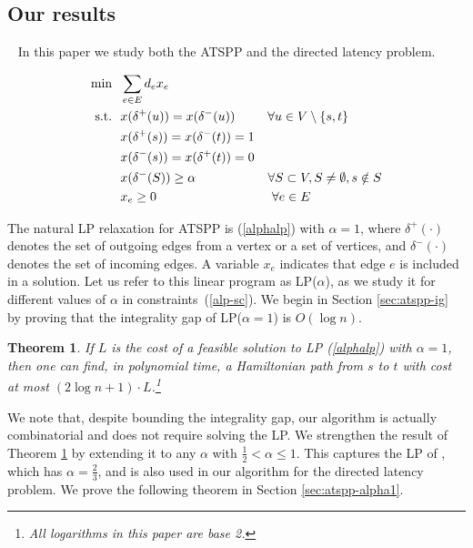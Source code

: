 \documentclass[11pt]{article}
\newtheorem{theorem}{Theorem}[section]
\begin{document}
\subsection{Our results}~
In this paper we study both the ATSPP and the directed latency problem.
\begin{figure}[ht]
\begin{align} 
\mbox{min}~~ & \sum_{e\in E} d_e x_e  \label{alphalp} \\
\mbox{s.t.}~~ & x(\delta^+(u))=x(\delta^-(u)) \hspace{9mm} \forall u\in V \setminus \{s,t\} \label{flcon} \\
& x(\delta^+(s))=x(\delta^-(t))=1  \label{con2}  \\
& x(\delta^-(s))=x(\delta^+(t))=0  \label{con3} \\
& x(\delta^-(S))\geq \alpha \hspace{20mm} \forall S\subset V, S \neq \emptyset, s\notin S \label{alp-sc} \\
& x_e \geq 0  \hspace{32mm}  \forall e\in E  \notag 
\end{align}
\end{figure}
The natural LP relaxation for ATSPP is (\ref{alphalp}) with $\alpha=1$, where $\delta^+(\cdot)$ denotes the set of outgoing edges from a vertex or a set of vertices, and $\delta^-(\cdot)$ denotes the set of incoming edges. A variable $x_e$ indicates that edge $e$ is included in a solution.
Let us refer to this linear program as LP($\alpha$), 
as we study it for different values of $\alpha$ in constraints~(\ref{alp-sc}). 
We begin in Section \ref{sec:atspp-ig} by proving that the integrality gap of LP($\alpha=1$) is $O(\log n)$.


\begin{theorem}\label{thm:ig}
If $L$ is the cost of a feasible solution to LP (\ref{alphalp})
with $\alpha =1$, then one can find, in polynomial time,
a Hamiltonian path from $s$ to $t$ with cost at most
$(2 \log n +1) \cdot L$.\footnote{All logarithms in this paper are base 2.}
\end{theorem}

We note that, despite bounding the integrality gap, our algorithm is actually combinatorial and does not require solving the LP. 
We strengthen the result of Theorem \ref{thm:ig} by extending it to any 
$\alpha$ with $\frac{1}{2} < \alpha \leq 1$. 
This captures the LP of \cite{nagarajan:ravi:latency}, which has $\alpha=\frac{2}{3}$, and is also used in our algorithm for the directed latency problem.
We prove the following theorem in Section \ref{sec:atspp-alpha1}.
\end{document}
